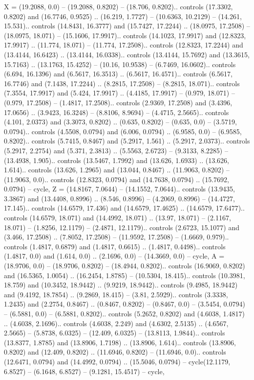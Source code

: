 {X} = {(19.2088, 0.0) -- (19.2088, 0.8202) -- (18.706, 0.8202).. controls (17.3302, 0.8202) and (16.7746, 0.9525) .. (16.219, 1.7727) -- (10.6363, 10.2129) -- (14.261, 15.531).. controls (14.8431, 16.3777) and (15.7427, 17.2244) .. (18.0975, 17.2508) -- (18.0975, 18.071) -- (15.1606, 17.9917).. controls (14.1023, 17.9917) and (12.8323, 17.9917) .. (11.774, 18.071) -- (11.774, 17.2508).. controls (12.8323, 17.2244) and (13.4144, 16.6423) .. (13.4144, 16.0338).. controls (13.4144, 15.7692) and (13.3615, 15.7163) .. (13.1763, 15.4252) -- (10.16, 10.9538) -- (6.7469, 16.0602).. controls (6.694, 16.1396) and (6.5617, 16.3513) .. (6.5617, 16.4571).. controls (6.5617, 16.7746) and (7.1438, 17.2244) .. (8.2815, 17.2508) -- (8.2815, 18.071).. controls (7.3554, 17.9917) and (5.424, 17.9917) .. (4.4185, 17.9917) -- (0.979, 18.071) -- (0.979, 17.2508) -- (1.4817, 17.2508).. controls (2.9369, 17.2508) and (3.4396, 17.0656) .. (3.9423, 16.3248) -- (8.8106, 8.9694) -- (4.4715, 2.5665).. controls (4.101, 2.0373) and (3.3073, 0.8202) .. (0.635, 0.8202) -- (0.635, 0.0) -- (3.5719, 0.0794).. controls (4.5508, 0.0794) and (6.006, 0.0794) .. (6.9585, 0.0) -- (6.9585, 0.8202).. controls (5.7415, 0.8467) and (5.2917, 1.561) .. (5.2917, 2.0373).. controls (5.2917, 2.2754) and (5.371, 2.3813) .. (5.5563, 2.6723) -- (9.3133, 8.2285) -- (13.4938, 1.905).. controls (13.5467, 1.7992) and (13.626, 1.6933) .. (13.626, 1.614).. controls (13.626, 1.2965) and (13.044, 0.8467) .. (11.9063, 0.8202) -- (11.9063, 0.0).. controls (12.8323, 0.0794) and (14.7638, 0.0794) .. (15.7692, 0.0794) -- cycle},
{Z} = {(14.8167, 7.0644) -- (14.1552, 7.0644).. controls (13.9435, 3.3867) and (13.4408, 0.8996) .. (8.546, 0.8996) -- (4.2069, 0.8996) -- (14.4727, 17.145).. controls (14.6579, 17.436) and (14.6579, 17.4625) .. (14.6579, 17.6477).. controls (14.6579, 18.071) and (14.4992, 18.071) .. (13.97, 18.071) -- (2.1167, 18.071) -- (1.8256, 12.1179) -- (2.4871, 12.1179).. controls (2.6723, 15.1077) and (3.466, 17.2508) .. (7.8052, 17.2508) -- (11.9592, 17.2508) -- (1.6669, 0.979).. controls (1.4817, 0.6879) and (1.4817, 0.6615) .. (1.4817, 0.4498).. controls (1.4817, 0.0) and (1.614, 0.0) .. (2.1696, 0.0) -- (14.3669, 0.0) -- cycle},
{A} = {(18.9706, 0.0) -- (18.9706, 0.8202) -- (18.4944, 0.8202).. controls (16.9069, 0.8202) and (16.5365, 1.0054) .. (16.2454, 1.8785) -- (10.5304, 18.415).. controls (10.3981, 18.759) and (10.3452, 18.9442) .. (9.9219, 18.9442).. controls (9.4985, 18.9442) and (9.4192, 18.7854) .. (9.2869, 18.415) -- (3.81, 2.5929).. controls (3.3338, 1.2435) and (2.2754, 0.8467) .. (0.8467, 0.8202) -- (0.8467, 0.0) -- (3.5454, 0.0794) -- (6.5881, 0.0) -- (6.5881, 0.8202).. controls (5.2652, 0.8202) and (4.6038, 1.4817) .. (4.6038, 2.1696).. controls (4.6038, 2.249) and (4.6302, 2.5135) .. (4.6567, 2.5665) -- (5.8738, 6.0325) -- (12.409, 6.0325) -- (13.8113, 1.9844).. controls (13.8377, 1.8785) and (13.8906, 1.7198) .. (13.8906, 1.614).. controls (13.8906, 0.8202) and (12.409, 0.8202) .. (11.6946, 0.8202) -- (11.6946, 0.0).. controls (12.6471, 0.0794) and (14.4992, 0.0794) .. (15.5046, 0.0794) -- cycle(12.1179, 6.8527) -- (6.1648, 6.8527) -- (9.1281, 15.4517) -- cycle},
